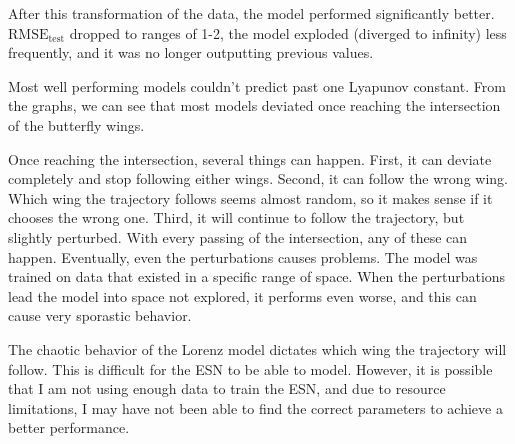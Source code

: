 \documentclass{article}
\begin{document}
After this transformation of the data, the model performed significantly
better. $\text{RMSE}_\text{test}$ dropped to ranges of 1-2, the model
exploded (diverged to infinity) less frequently, and it was no longer
outputting previous values.

Most well performing models couldn't predict past one Lyapunov constant. From
the graphs, we can see that most models deviated once reaching the
intersection of the butterfly wings.

Once reaching the intersection, several things can happen. First, it can
deviate completely and stop following either wings. Second, it can follow the
wrong wing. Which wing the trajectory follows seems almost random, so it
makes sense if it chooses the wrong one. Third, it will continue to follow
the trajectory, but slightly perturbed. With every passing of the
intersection, any of these can happen. Eventually, even the perturbations
causes problems. The model was trained on data that existed in a specific
range of space. When the perturbations lead the model into space not
explored, it performs even worse, and this can cause very sporastic behavior.

The chaotic behavior of the Lorenz model dictates which wing the trajectory
will follow. This is difficult for the ESN to be able to model. However, it
is possible that I am not using enough data to train the ESN, and due to
resource limitations, I may have not been able to find the correct parameters
to achieve a better performance.
\end{document}

